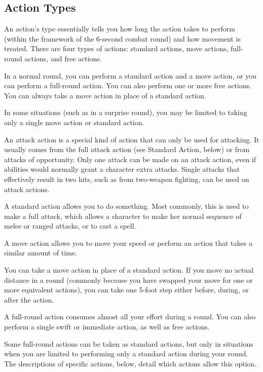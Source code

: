 \subsection{Action Types}
An action's type essentially tells you how long the action takes to perform (within the framework of the 6-second combat round) and how movement is treated. There are four types of actions: standard actions, move actions, full-round actions, and free actions.

In a normal round, you can perform a standard action and a move action, or you can perform a full-round action. You can also perform one or more free actions. You can always take a move action in place of a standard action.

In some situations (such as in a surprise round), you may be limited to taking only a single move action or standard action.

 An attack action is a special kind of action that can only be used for attacking. It usually comes from the full attack action (see Standard Action, below) or from attacks of opportunity. Only one attack can be made on an attack action, even if abilities would normally grant a character extra attacks. Single attacks that effectively result in two hits, such as from two-weapon fighting, can be used on attack actions.

 A standard action allows you to do something. Most commonly, this is used to make a full attack, which allows a character to make her normal sequence of melee or ranged attacks, or to cast a spell.

 A move action allows you to move your speed or perform an action that takes a similar amount of time.

You can take a move action in place of a standard action. If you move no actual distance in a round (commonly because you have swapped your move for one or more equivalent actions), you can take one 5-foot step either before, during, or after the action.

 A full-round action consumes almost all your effort during a round. You can also perform a single swift or immediate action, as well as free actions.

Some full-round actions can be taken as standard actions, but only in situations when you are limited to performing only a standard action during your round. The descriptions of specific actions, below, detail which actions allow this option.

